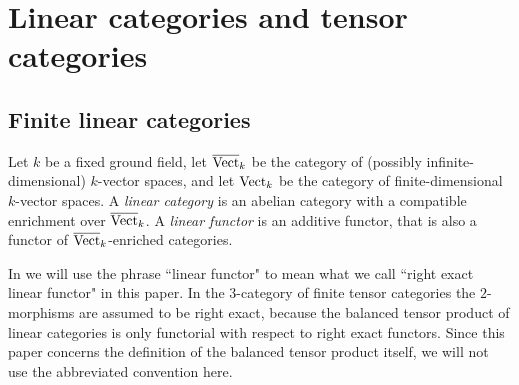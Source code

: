 \documentclass{amsart}
\begin{document}


\section{Linear categories and tensor categories} \label{sec:tc-lincat}

\subsection{Finite linear categories}

	Let $k$ be a fixed ground field, let $\overline{\mathrm{Vect}}_k$ be the category of (possibly infinite-dimensional) $k$-vector spaces, and let $\mathrm{Vect}_k$ be the category of finite-dimensional $k$-vector spaces.   A {\em linear category} is an abelian category with a compatible enrichment over $\overline{\mathrm{Vect}}_k$. 
A {\em linear functor} is an additive functor, that is also a functor of $\overline{\mathrm{Vect}}_k$-enriched categories. 

\begin{warning}
	In \cite{DTCI} we will use the phrase ``linear functor" to mean what we call ``right exact linear functor" in this paper.  In the $3$-category of finite tensor categories the $2$-morphisms are assumed to be right exact, because the balanced tensor product of linear categories is only functorial with respect to right exact functors.  Since this paper concerns the definition of the balanced tensor product itself, we will not use the abbreviated convention here.
\end{warning}
\end{document}
